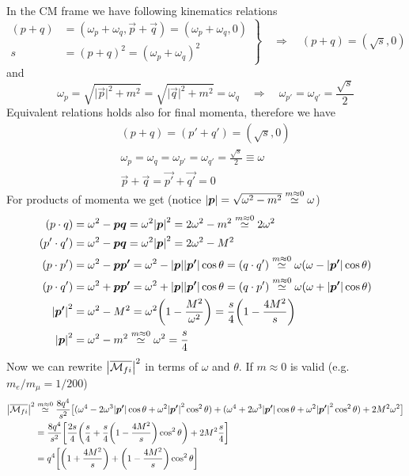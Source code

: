 \documentclass[TheoreticalPhy_ModB.tex]{subfiles}
\begin{document}
\begin{figure}[H]
\centering

\end{figure}
%
In the CM frame we have following kinematics relations
\[
\left.
\begin{aligned}
(p + q)	& = (\omega_p + \omega_q, \vec{p} + \vec{q}) = (\omega_p + \omega_q, 0) \\
s 		& = (p + q)^2 = (\omega_p + \omega_q)^2
\end{aligned}
\right \}\quad \Rightarrow\quad (p + q) = (\sqrt{s}, 0)
\]
and
\[
\omega_p = \sqrt{\vert\vec p\vert^2+m^2} = \sqrt{\vert\vec q\vert^2+m^2}=\omega_q
\quad\Rightarrow\quad \omega_{p'} = \omega_{q'} = \frac{\sqrt{s}}{2}
\]
Equivalent relations holds also for final momenta, therefore we have
\begin{gather*}
(p+q) = (p' + q') = (\sqrt{s}, 0) \\
\omega_p = \omega_q = \omega_{p'} = \omega_{q'} = \frac{\sqrt{s}}{2} \equiv \omega\\
\vec p+\vec q = \vec {p'}+\vec{q'}=0
\end{gather*}
For products of momenta we get (notice $\abs{\boldsymbol p}=\sqrt{\omega^2-m^2}\overset{m\approx0}{\simeq}\omega$)
\begin{align*}
(p \cdot q) 		& = \omega^2 - \boldsymbol{p}\boldsymbol{q} = \omega^2 \abs{\boldsymbol{p}}^2 = 2 \omega^2 - m^2 
	\overset{m\approx0}{\simeq} 2\omega^2 \\
(p' \cdot q') 		& = \omega^2 - \boldsymbol{p}\boldsymbol{q} = \omega^2 \abs{\boldsymbol{p}}^2 = 2 \omega^2 - M^2 \notag \\
(p \cdot p') 		& = \omega^2 - \boldsymbol{p}\boldsymbol{p'} = \omega^2 - \abs{\boldsymbol{p}}\abs{\boldsymbol{p'}}\cos \theta = (q \cdot q')
	\overset{m \approx 0}{\simeq} \omega(\omega - \abs{\boldsymbol{p'}} \cos \theta) \\
(p \cdot q')		& = \omega^2 + \boldsymbol{p} \boldsymbol{p'} = \omega^2 + \abs{\boldsymbol{p}}\abs{\boldsymbol{p'}}\cos \theta =(q \cdot p')
	\overset{m \approx 0}{\simeq} \omega(\omega + \abs{\boldsymbol{p'}}\cos \theta)  \\
\abs{\boldsymbol{p'}}^2 	& = \omega^2 - M^2 = \omega^2 \biggl( 1 - \frac{M^2}{\omega^2} \biggr)
	= \frac{s}{4} \biggl( 1 - \frac{4M^2}{s} \biggr) \\
\abs{\boldsymbol{p}}^2 	& = \omega^2 - m^2 \overset{m \approx 0}{\simeq} \omega^2 = \frac{s}{4}
\end{align*}
Now we can rewrite ${\abs{\overline{\mathcal{M}_{fi}}}^2}$ in terms of $\omega$ and $\theta$. If $m\approx0$ is valid (e.g. $m_e/m_{\mu} = 1/200$)
\begin{align*}
\abs{\overline{\mathcal{M}_{fi}}}^2
	& \overset{m \approx 0}{\simeq} \frac{8q^4}{s^2} \bigl[ (\omega^4 - 2 \omega^3 \abs{\boldsymbol{p'}} \cos \theta + \omega^2 \abs{\boldsymbol{p'}}^2 \cos^2 \theta) 
		+ (\omega^4 + 2 \omega^3 \abs{\boldsymbol{p'}} \cos \theta + \omega^2 \abs{\boldsymbol{p'}}^2 \cos^2 \theta) + 2M^2\omega^2 \bigr] \\
	& = \frac{8q^4}{s^2} \biggl[ \frac{2s}{4} \biggl( \frac{s}{4} + \frac{s}{4} \biggl( 1 - \frac{4M^2}{s} \biggr) \cos^2 \theta \biggr)
		+ 2M^2 \frac{s}{4} \biggr]	\\
	& = q^4 \biggl[ \biggl( 1 + \frac{4M^2}{s} \biggr) + \biggl( 1 - \frac{4M^2}{s} \biggr) \cos^2 \theta \biggr] 				 
\end{align*}
\end{document}
